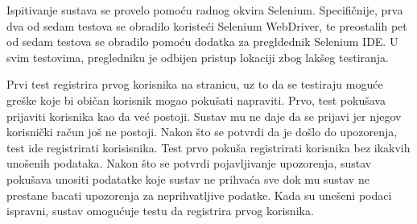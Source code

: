         \textbf{}{Ispitivanje sustava se provelo pomoću radnog okvira Selenium. Specifičnije, prva dva od sedam testova se obradilo koristeći Selenium WebDriver, te preostalih pet od sedam testova se obradilo pomoću dodatka za pregldednik Selenium IDE. U svim testovima, pregledniku je odbijen pristup lokaciji zbog lakšeg testiranja.}
        \textbf{}{
        
        }
        \textbf{}{Prvi test registrira prvog korisnika na stranicu, uz to da se testiraju moguće greške koje bi običan korisnik mogao pokušati napraviti. Prvo, test pokušava prijaviti korisnika kao da već postoji. Sustav mu ne daje da se prijavi jer njegov korisnički račun još ne postoji. Nakon što se potvrdi da je došlo do upozorenja, test ide registrirati korisisnika. Test prvo pokuša registrirati korisnika bez ikakvih unošenih podataka. Nakon što se potvrdi pojavljivanje upozorenja, sustav pokušava unositi podatatke koje sustav ne prihvaća sve dok mu sustav ne prestane bacati upozorenja za neprihvatljive podatke. Kada su unešeni podaci ispravni, sustav omogućuje testu da registrira prvog korisnika.}
